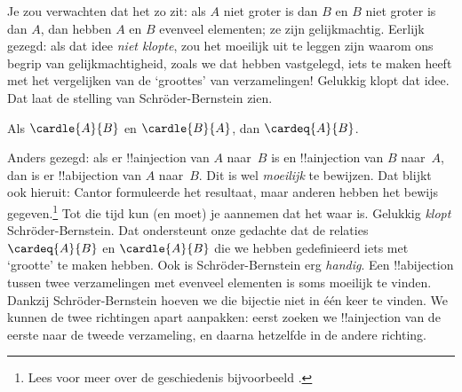 \documentclass[openany]{memoir}
\begin{document}
\begingroup
\def\olfilename{OLP-0037}
\def\olfilepath{content/sets-functions-relations/size-of-sets/}
\hypertarget{unit-OLP-0037}{}



\begin{explain}
Je zou verwachten dat het zo zit: als $A$ niet groter is dan $B$ en $B$
niet groter is dan $A$, dan hebben $A$ en $B$ evenveel elementen; ze
zijn gelijkmachtig. Eerlijk gezegd: als dat idee \emph{niet klopte},
zou het moeilijk uit te leggen zijn waarom ons begrip van
gelijkmachtigheid, zoals we dat hebben vastgelegd, iets te maken heeft
met het vergelijken van de ‘groottes’ van verzamelingen!{} Gelukkig
klopt dat idee. Dat laat de stelling van Schr\"oder-Bernstein zien.
\end{explain}
\begin{thm}
	Als $\cardle{A}{B}$ en $\cardle{B}{A}$,
	dan $\cardeq{A}{B}$.
\end{thm}
\begin{explain}
Anders gezegd: als er !!a{injection} van $A$ naar~$B$ is en
!!a{injection} van $B$ naar~$A$, dan is er !!a{bijection} van $A$
naar~$B$.
Dit is wel \emph{moeilijk} te bewijzen. Dat blijkt ook hieruit: Cantor
formuleerde het resultaat, maar anderen hebben het bewijs
gegeven.\footnote{Lees voor meer over de geschiedenis bijvoorbeeld
\citet[pp.~165--6]{Potter2004}.}
%
Tot die tijd kun (en moet) je aannemen dat het waar is.
Gelukkig \emph{klopt} Schr\"oder-Bernstein. Dat ondersteunt onze gedachte
dat de relaties $\cardeq{A}{B}$ en $\cardle{A}{B}$ die we hebben
gedefinieerd iets met ‘grootte’ te maken hebben. Ook is
Schr\"oder-Bernstein erg \emph{handig}.
Een !!a{bijection} tussen twee verzamelingen met evenveel elementen is
soms moeilijk te vinden. Dankzij Schr\"oder-Bernstein hoeven we die
bijectie niet in één keer te vinden. We kunnen de twee richtingen apart
aanpakken: eerst zoeken we !!a{injection} van de eerste naar de tweede
verzameling, en daarna hetzelfde in de andere richting.
\end{explain}
\endgroup
\end{document}

